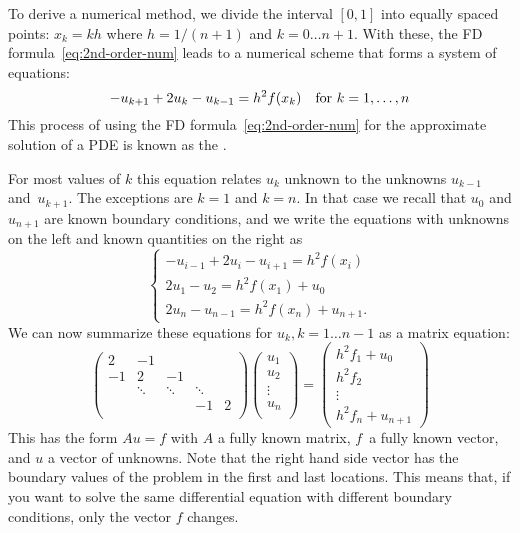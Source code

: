 To derive a numerical method,
we divide the interval $[0,1]$ into equally spaced points: $x_k=kh$
where $h=1/(n+1)$ and $k=0\ldots n+1$. With these, the \ac{FD}
formula~\eqref{eq:2nd-order-num} leads to a numerical scheme that
forms a system of equations:
\begin{equation}
  \label{eq:2nddiff-formula}
   -u_{k+1}+2u_k-u_{k-1} = h^2 f(x_k)
  \quad\hbox{for $k=1,\ldots,n$} 
\end{equation}
This process of using the \ac{FD} formula~\eqref{eq:2nd-order-num}
for the approximate solution of a \ac{PDE} is known as the
.

For most values of $k$ this equation relates $u_k$ unknown to the
unknowns $u_{k-1}$ and~$u_{k+1}$. The exceptions are $k=1$ and
$k=n$. In that case we recall that $u_0$ and $u_{n+1}$ are known
boundary conditions,
and we write the equations with unknowns on the left and known
quantities on the right as
\begin{equation}
\begin{cases}
  -u_{i-1} + 2u_i - u_{i+1} = h^2f(x_i)\\
  2u_1-u_2=h^2f(x_1)+u_0\\
  2u_n-u_{n-1}=h^2f(x_{n})+u_{n+1}.
\end{cases}
\end{equation}
We can now summarize these equations for $u_k,k=1\ldots n-1$
as a matrix equation:
\begin{equation}
    \begin{pmatrix}
      2&-1\\
      -1&2&-1\\
      &\ddots&\ddots&\ddots\\
      &&&-1&2\\
    \end{pmatrix}
    \begin{pmatrix}
      u_1\\ u_2\\ \vdots\\ u_n\\
    \end{pmatrix}
  =
    \begin{pmatrix}
      h^2f_1+u_0\\
      h^2f_2\\
      \vdots\\
      h^2f_n+u_{n+1}
    \end{pmatrix}
    \label{eq:1d2nd-matrix-vector}
\end{equation}
This has the form $Au=f$ with $A$ a fully known matrix, $f$~a fully
known vector, and $u$ a vector of unknowns. Note that the right hand
side vector has the boundary values of the problem in the first and
last locations. This means that, if you want to solve the same
differential equation with different boundary conditions, only the
vector $f$ changes.


